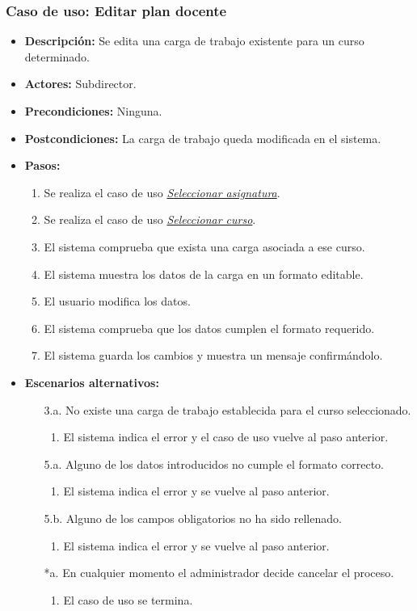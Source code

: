 \documentclass{book}
\begin{document}
\subsubsection*{Caso de uso: Editar plan docente}
\begin{itemize}
\item{\bf Descripción:} Se edita una carga de trabajo existente para un curso determinado.
\item{\bf Actores:} Subdirector.
\item{\bf Precondiciones:} Ninguna.
\item{\bf Postcondiciones:} La carga de trabajo queda modificada en el sistema.
\item{\bf Pasos:}
	\begin{enumerate}
	\item Se realiza el caso de uso {\em \hyperref[select_asignatura]{Seleccionar asignatura}}.
	\item Se realiza el caso de uso {\em \hyperref[select_curso]{Seleccionar curso}}.
	\item El sistema comprueba que exista una carga asociada a ese curso.
	\item El sistema muestra los datos de la carga en un formato editable.
	\item El usuario modifica los datos.
	\item El sistema comprueba que los datos cumplen el formato requerido.
	\item El sistema guarda los cambios y muestra un mensaje confirmándolo.
	\end{enumerate}
\item{\bf Escenarios alternativos:}
	\begin{itemize}
	\item[3.a.] No existe una carga de trabajo establecida para el curso seleccionado.
		\begin{enumerate}
		\item El sistema indica el error y el caso de uso vuelve al paso anterior.
		\end{enumerate}
	\item[5.a.] Alguno de los datos introducidos no cumple el formato correcto.
		\begin{enumerate}
		\item El sistema indica el error y se vuelve al paso anterior.
		\end{enumerate}
	\item[5.b.] Alguno de los campos obligatorios no ha sido rellenado.
		\begin{enumerate}
		\item El sistema indica el error y se vuelve al paso anterior.
		\end{enumerate}	
	\item[*a.] En cualquier momento el administrador decide cancelar el proceso.
		\begin{enumerate}
		\item El caso de uso se termina.
		\end{enumerate}
	\end{itemize}
\end{itemize}
\end{document}
